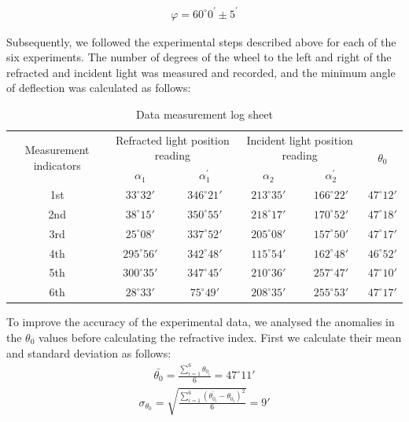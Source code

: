 \documentclass[UTF8]{article}
\begin{document}
    \begin{eqnarray}
    \varphi = 60^{\circ} 0^{'} \pm 5^{'} 
    \end{eqnarray}
   
   Subsequently, we followed the experimental steps described above for each of the six experiments. The number of degrees of the wheel to the left and right of the refracted and incident light was measured and recorded, and the minimum angle of deflection was calculated as follows:
   
\begin{table}[htbp]
  \centering
  \caption{Data measurement log sheet}
    \begin{tabular}{cccccc}
    \toprule[2pt]
    \multicolumn{1}{c}{\multirow{2}[0]{*}{Measurement indicators}} & \multicolumn{2}{c}{Refracted light position reading} & \multicolumn{2}{c}{Incident light position reading} &
     \multicolumn{1}{c}{\multirow{2}[0]{*}{$\theta _{0} $}} \\
     \cmidrule{2-3} 
     \cmidrule{4-5}
          & $\alpha_1 $ & $\alpha^{'}_1 $ & $\alpha_2 $ & $\alpha^{'}_2 $ &  \\
    \midrule
    1st   & $33^{\circ}32'$ & $346^{\circ}21'$ & $213^{\circ}35'$ & $166^{\circ}22'$ & $47^{\circ}12'$ \\
    2nd   & $38^{\circ}15'$ & $350^{\circ}55'$ & $218^{\circ}17'$ & $170^{\circ}52'$ & $47^{\circ}18'$ \\
    3rd   & $25^{\circ}08'$ & $337^{\circ}52'$ & $205^{\circ}08'$ & $157^{\circ}50'$ & $47^{\circ}17'$ \\
    4th   & $295^{\circ}56'$ & $342^{\circ}48'$ & $115^{\circ}54'$ & $162^{\circ}48'$ & $46^{\circ}52'$ \\
    5th   & $300^{\circ}35'$ & $347^{\circ}45'$ & $210^{\circ}36'$ & $257^{\circ}47'$ & $47^{\circ}10'$ \\
    6th   & $28^{\circ}33'$ & $75^{\circ}49'$ & $208^{\circ}35'$ & $255^{\circ}53'$ & $47^{\circ}17'$ \\
    \bottomrule[2pt]
    \end{tabular}%
  \label{tab:addlabel}%
\end{table}%

   To improve the accuracy of the experimental data, we analysed the anomalies in the $\theta _0$ values before calculating the refractive index. First we calculate their mean and standard deviation as follows:
   \begin{eqnarray}
   \bar{\theta _0}  = \frac{\sum_{i=1}^{6}\theta _{0_{i} }  }{6} =47^{\circ} 11'
   \end{eqnarray}
   \begin{eqnarray}
   \sigma _{\theta _{0} } =\sqrt{\frac{ {\textstyle \sum_{i=1}^{6}}\left ( \bar{\theta _{0_i}} - \theta _{0_i}\right )^2  }{6}   } = 9' 
   \end{eqnarray}
   
\end{document}
